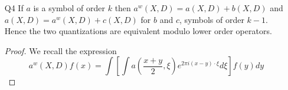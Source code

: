 \documentclass[11pt]{article}
\theoremstyle{remark}
\newcommand{\1}{\textbf{1}}
\newcommand{\lle}{\lesssim}
\def\brac#1{\langle #1  \rangle}
\begin{document}
\begin{enumerate}
\begin{proof}
\[
m_j(\xi) = \int e^{2 \pi i x \cdot \xi} \check{m}(x) dx
\]
we can compute
\[
\xi^\gamma \partial_\alpha^\xi m_j(\xi) = \int \partial_x^\gamma [ (2 \pi i x)^\alpha m_j(x)] e^{2 \pi i x \cdot \xi} dx.
\]
Now, recalling that $\check{m}_j$ has support in $|x| \sim 2^j$ we have
\begin{align*}
\partial_x^\gamma [ (2 \pi i x)^\alpha m_j(x) &= \sum_{|c| < |\gamma|} (2 \pi i x)^{\alpha - c} \partial_x^{\gamma - c} \delta(2^{-j} x) \check{m}(x) \\
&= \sum_{|c| < |\gamma|} \sum_{|b| < |\gamma| - |c|} (2 \pi i x)^{\alpha - c} 2^{-j|b|} |x|^{-d-k-|\gamma| + |c| + |b|} \brac{\xi}^{-N}.
\end{align*}
And hence, since the support of $m_j$ has volume $2^{jd}$, we have
\begin{align}
|\xi^\gamma \partial_\alpha^\xi m_j(\xi)| \lle_{\alpha,d} 2^{j(|\alpha|-k-|\gamma|)} \brac{\xi}^{-N}.
\label{eq:goodest}
\end{align}
Using \eqref{eq:goodest} with $\gamma = 0 = N$,
\[
\sum_{2^j \leq |\xi|^{-1}} |\xi^\gamma \partial_\alpha^\xi m_j(\xi)| \lle_\alpha \sum_{2^j \leq |\xi|^{-1}} 2^{j(|\alpha|-k)} \lle_\alpha \brac{\xi}^{k-|\alpha|}.
\]
Similarly, with $N > |\alpha| - k$ we have
\[
\sum_{2^j > |\xi|^{-1}} |\xi^\gamma \partial_\alpha^\xi m_j(\xi)| \lle_\alpha \brac{\xi}^{-N} \sum_{2^j > |\xi|^{-1}} 2^{j(|\alpha|-k-N)} \lle_\alpha \brac{\xi}^{k-|\alpha|},
\]
proving the claim.
\end{proof}
\item[Q4] If $a$ is a symbol of order $k$ then $a^w(X,D) = a(X,D) + b(X,D)$ and $a(X,D) = a^w(X,D) + c(X,D)$ for $b$ and $c$, symbols of order $k-1$. Hence the two quantizations are equivalent modulo lower order operators.
\begin{proof}
We recall the expression
\[
a^w(X,D)f(x) = \int \left[\int a\left(\frac{x+y}{2},\xi \right) e^{2 \pi i(x-y) \cdot \xi} d\xi \right]f(y) dy
\]
\end{proof}
\end{enumerate}
\end{document}
